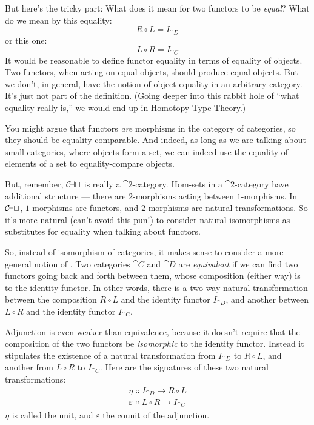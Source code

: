 \noindent
But here's the tricky part: What does it mean for two functors to be
\emph{equal}? What do we mean by this equality:
\[R \circ L = I_{\cat{D}}\]
or this one:
\[L \circ R = I_{\cat{C}}\]
It would be reasonable to define functor equality in terms of equality
of objects. Two functors, when acting on equal objects, should produce
equal objects. But we don't, in general, have the notion of object
equality in an arbitrary category. It's just not part of the definition.
(Going deeper into this rabbit hole of ``what equality really is,'' we
would end up in Homotopy Type Theory.)

You might argue that functors \emph{are} morphisms in the category of
categories, so they should be equality-comparable. And indeed, as long
as we are talking about small categories, where objects form a set, we
can indeed use the equality of elements of a set to equality-compare
objects.

But, remember, $\mathcal{C\mkern-3mu at}$ is really a $\cat{2}$-category. Hom-sets in a
$\cat{2}$-category have additional structure --- there are $2$-morphisms acting
between $1$-morphisms. In $\mathcal{C\mkern-3mu at}$, $1$-morphisms are functors, and
$2$-morphisms are natural transformations. So it's more natural (can't
avoid this pun!) to consider natural isomorphisms as substitutes for
equality when talking about functors.

So, instead of isomorphism of categories, it makes sense to consider a
more general notion of . Two categories $\cat{C}$ and
$\cat{D}$ are \emph{equivalent} if we can find two functors going back
and forth between them, whose composition (either way) is
 to the identity functor. In other words,
there is a two-way natural transformation between the composition
$R \circ L$ and the identity functor $I_{\cat{D}}$, and another
between $L \circ R$ and the identity functor $I_{\cat{C}}$.

Adjunction is even weaker than equivalence, because it doesn't require
that the composition of the two functors be \emph{isomorphic} to the
identity functor. Instead it stipulates the existence of a  natural transformation from $I_{\cat{D}}$ to $R \circ L$, and
another from $L \circ R$ to $I_{\cat{C}}$. Here are the signatures of
these two natural transformations:
\begin{gather*}
\eta \Colon I_{\cat{D}} \to R \circ L \\
\varepsilon \Colon L \circ R \to I_{\cat{C}}
\end{gather*}
$\eta$ is called the unit, and $\varepsilon$ the counit of the adjunction.

